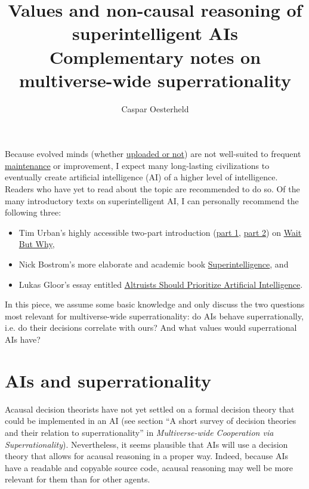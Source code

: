 \documentclass[]{article}
\title{Values and non-causal reasoning of superintelligent AIs \\ \vspace{5mm} \small{Complementary notes on multiverse-wide superrationality}}
\author{Caspar Oesterheld}
\date{}
\begin{document}
\maketitle

Because evolved minds (whether
\href{https://en.wikipedia.org/wiki/Mind_uploading}{uploaded or
not}) are not well-suited to frequent
\href{https://en.wikipedia.org/wiki/Software_maintenance}{maintenance}
or improvement, I expect many long-lasting civilizations to eventually
create artificial intelligence (AI) of a higher level of intelligence.
Readers who have yet to read about the topic are recommended to do so.
Of the many introductory texts on superintelligent AI, I can personally
recommend the following three:

\begin{itemize}
\item
  Tim Urban's highly accessible two-part introduction
  (\href{http://waitbutwhy.com/2015/01/artificial-intelligence-revolution-1.html}{part
  1},
  \href{http://waitbutwhy.com/2015/01/artificial-intelligence-revolution-2.html}{part
  2}) on \href{http://waitbutwhy.com/}{Wait But Why},
\item
  Nick Bostrom's more elaborate and academic book
  \href{https://en.wikipedia.org/wiki/Superintelligence:_Paths,_Dangers,_Strategies}{Superintelligence},
  and
\item
  Lukas Gloor's essay entitled
  \href{https://foundational-research.org/altruists-should-prioritize-artificial-intelligence/}{Altruists
  Should Prioritize Artificial Intelligence}.
\end{itemize}

In this piece, we assume some basic knowledge and only discuss the two
questions most relevant for multiverse-wide superrationality: do AIs
behave superrationally, i.e. do their decisions correlate with ours? And
what values would superrational AIs have?

\section{AIs and superrationality}\label{ais-and-superrationality}

Acausal decision theorists have not yet settled on a formal decision
theory that could be implemented in an AI (see section ``A short survey
of decision theories and their relation to superrationality'' in
\emph{Multiverse-wide Cooperation via Superrationality}).
Nevertheless, it seems plausible that AIs will use a decision
theory that allows for acausal reasoning in a proper way. Indeed,
because AIs have a readable and copyable source code, acausal reasoning
may well be more relevant for them than for other agents.
\end{document}
